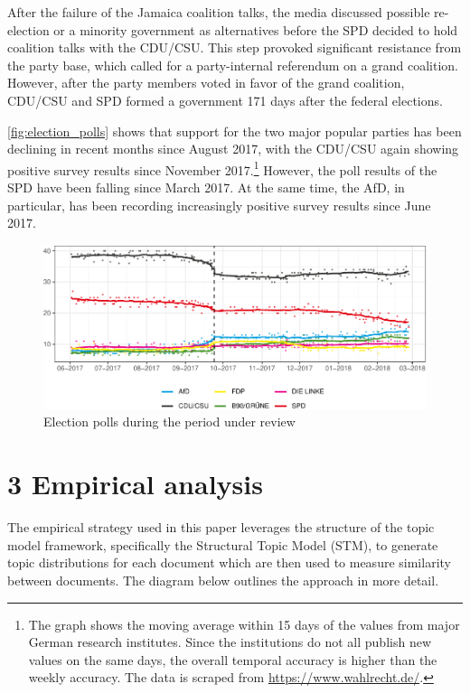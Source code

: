 \documentclass[
  12pt,
]{article}
\begin{document}
After the failure of the Jamaica coalition talks, the media discussed
possible re-election or a minority government as alternatives before the
SPD decided to hold coalition talks with the CDU/CSU. This step provoked
significant resistance from the party base, which called for a
party-internal referendum on a grand coalition. However, after the party
members voted in favor of the grand coalition, CDU/CSU and SPD formed a
government 171 days after the federal elections.

\autoref{fig:election_polls} shows that support for the two major
popular parties has been declining in recent months since August 2017,
with the CDU/CSU again showing positive survey results since November
2017.\footnote{The graph shows the moving average within 15 days of the
  values from major German research institutes. Since the institutions
  do not all publish new values on the same days, the overall temporal
  accuracy is higher than the weekly accuracy. The data is scraped from
  \url{https://www.wahlrecht.de/}.} However, the poll results of the SPD
have been falling since March 2017. At the same time, the AfD, in
particular, has been recording increasingly positive survey results
since June 2017.

\begin{figure}

{\centering \includegraphics[width=0.8\linewidth]{chap1_files/figure-latex/election polls-1} 

}

\caption{Election polls during the period under review \label{fig:election_polls}}\label{fig:election polls}
\end{figure}

\pagebreak

\hypertarget{empirical-analysis}{%
\section{3 Empirical analysis}\label{empirical-analysis}}

The empirical strategy used in this paper leverages the structure of the
topic model framework, specifically the Structural Topic Model (STM), to
generate topic distributions for each document which are then used to
measure similarity between documents. The diagram below outlines the
approach in more detail.
\end{document}
